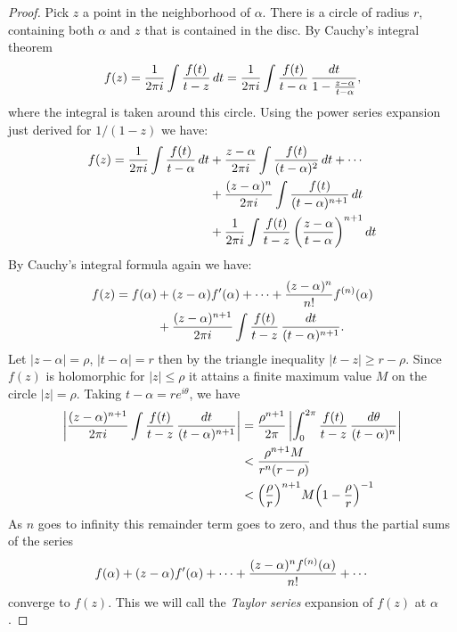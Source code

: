 \begin{proof}
Pick $z$ a point in the neighborhood of $\alpha$.  There is a circle
of radius $r$, containing both $\alpha$ and $z$ that is contained in the disc.
By Cauchy's integral theorem 
\[
f(z) = {1 \over 2 \pi i} \int {f(t) \over t - z}\, dt
= {1 \over 2 \pi i} \int {f(t) \over t - \alpha} \, 
{dt \over 1 - {z - \alpha \over t - \alpha}},
\]
where the integral is taken around this circle.  Using the power series
expansion just derived for $1 / (1 - z)$ we have:
\[
\begin{aligned}
  f(z) = {1 \over 2 \pi i} \int {f(t) \over t - \alpha} \, dt
    &+ {z - \alpha \over 2 \pi i } \int {f(t) \over (t - \alpha)^2} \, dt +
      \cdots \\
    &+ {(z - \alpha)^n \over 2 \pi i } \int {f(t) \over (t - \alpha)^{n+1}} \,dt\\
    &+
      {1 \over 2 \pi i} \int {f(t) \over t - z} \,
      {\left( {z - \alpha \over t - \alpha} \right)}^{n+1}\,dt
\end{aligned}
\]
By Cauchy's integral formula again we have: 
\[
\begin{aligned}
f(z) = f(\alpha) &+ (z - \alpha) f^{\prime}(\alpha) + \cdots
+ {(z - \alpha)^n \over n!} f^{(n)}(\alpha) \\
  &+ {(z - \alpha)^{n+1} \over 2 \pi i} 
\int {f(t) \over t - z} \,{dt \over (t - \alpha)^{n+1}}.
\end{aligned}
\]
Let $|z - \alpha| = \rho$, $|t - \alpha | = r$ then by the triangle
inequality $|t - z| \ge r - \rho$.  Since $f(z)$ is holomorphic for
$|z | \le \rho$ it attains a finite maximum value $M$ on the circle
$|z | = \rho$.  Taking $t - \alpha = re^{i\theta}$, we have
\[
\begin{aligned}
  \left|{(z - \alpha)^{n+1} \over 2 \pi i}
    \int {f(t) \over t - z} \, {dt \over (t - \alpha)^{n+1}} \right| & =
      {\rho^{n+1} \over 2\pi} \left|
      \int^{2\pi}_0 {f(t) \over t - z}\, {d\theta \over (t - \alpha)^n}\right|\\
    &< {\rho^{n+1} M \over r^n (r - \rho)}\\
    &< {\left( {\rho \over r} \right)}^{n+1} M {\left( 1 - {\rho \over r}
      \right)}^{-1}
\end{aligned}
\]
As $n$ goes to infinity this remainder term goes to zero, and thus the
partial sums of the series 
\[
f(\alpha) + (z - \alpha)f^{\prime}(\alpha) + \cdots + 
{(z - \alpha)^n f^{(n)}(\alpha) \over n!} + \cdots
\]
converge to $f(z)$.  This we will call the {\em Taylor series} expansion of
$f(z)$ at $\alpha$.
\end{proof}

